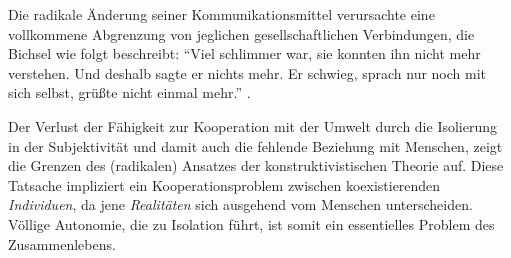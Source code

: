 Die radikale Änderung seiner Kommunikationsmittel verursachte eine vollkommene Abgrenzung von jeglichen gesellschaftlichen Verbindungen, die Bichsel wie folgt beschreibt:
``Viel schlimmer war, sie konnten ihn nicht mehr verstehen. Und deshalb sagte er nichts mehr. Er schwieg, sprach nur noch mit sich selbst, grüßte nicht einmal mehr.'' \textcite[vgl.][25]{bichsel-1990}.

Der Verlust der Fähigkeit zur Kooperation mit der Umwelt durch die Isolierung in der Subjektivität und damit auch die fehlende Beziehung mit Menschen, zeigt die Grenzen des (radikalen) Ansatzes der konstruktivistischen Theorie auf.
Diese Tatsache impliziert ein Kooperationsproblem zwischen koexistierenden \emph{Individuen}, da jene \emph{Realitäten} sich ausgehend vom Menschen unterscheiden.
Völlige Autonomie, die zu Isolation führt, ist somit ein essentielles Problem des Zusammenlebens.
